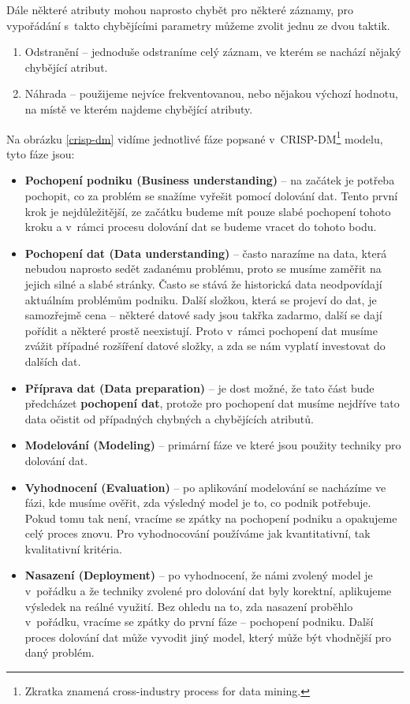 \par Dále některé atributy mohou naprosto chybět pro některé záznamy, pro vypořádání s~takto chybějícími parametry můžeme zvolit jednu ze dvou taktik. \cite{data-mining-principles}
\begin{enumerate}
\item Odstranění -- jednoduše odstraníme celý záznam, ve kterém se nachází nějaký chybějící atribut.
\item Náhrada -- použijeme nejvíce frekventovanou, nebo nějakou výchozí hodnotu, na místě ve kterém najdeme chybějící atributy. \cite{data-mining-principles}
\end{enumerate}

\par Na obrázku \ref{crisp-dm} vidíme jednotlivé fáze popsané v~CRISP-DM\footnote{Zkratka znamená cross-industry process for data mining.} modelu, tyto fáze jsou:
\begin{itemize}
\item \textbf{Pochopení podniku (Business understanding)} -- na začátek je potřeba pochopit, co za problém se snažíme vyřešit pomocí dolování dat. Tento první krok je nejdůležitější, ze začátku budeme mít pouze slabé pochopení tohoto kroku a v~rámci procesu dolování dat se budeme vracet do tohoto bodu. \cite{data-mining-practical}
\item \textbf{Pochopení dat (Data understanding)} -- často narazíme na data, která nebudou naprosto sedět zadanému problému, proto se musíme zaměřit na jejich silné a slabé stránky. Často se stává že historická data neodpovídají aktuálním problémům podniku. Další složkou, která se projeví do dat, je samozřejmě cena -- některé datové sady jsou takřka zadarmo, další se dají pořídit a některé prostě neexistují. Proto v~rámci pochopení dat musíme zvážit případné rozšíření datové složky, a zda se nám vyplatí investovat do dalších dat. \cite{data-mining-practical}
\item \textbf{Příprava dat (Data preparation)} -- je dost možné, že tato část bude předcházet \textbf{pochopení dat}, protože pro pochopení dat musíme nejdříve tato data očistit od případných chybných a chybějících atributů. \cite{data-mining-practical}
\item \textbf{Modelování (Modeling)} -- primární fáze ve které jsou použity techniky pro dolování dat. \cite{data-mining-practical}
\item \textbf{Vyhodnocení (Evaluation)} -- po aplikování modelování se nacházíme ve fázi, kde musíme ověřit, zda výsledný model je to, co podnik potřebuje. Pokud tomu tak není, vracíme se zpátky na pochopení podniku a opakujeme celý proces znovu. Pro vyhodnocování používáme jak kvantitativní, tak kvalitativní kritéria. \cite{data-mining-practical}
\item \textbf{Nasazení (Deployment)} -- po vyhodnocení, že námi zvolený model je v~pořádku a že techniky zvolené pro dolování dat byly korektní, aplikujeme výsledek na reálné využití. Bez ohledu na to, zda nasazení proběhlo v~pořádku, vracíme se zpátky do první fáze -- pochopení podniku. Další proces dolování dat může vyvodit jiný model, který může být vhodnější pro daný problém. \cite{data-mining-practical}
\end{itemize}

